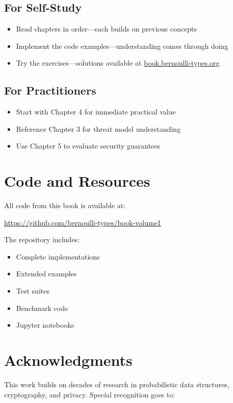 \subsection*{For Self-Study}
\begin{itemize}
\item Read chapters in order—each builds on previous concepts
\item Implement the code examples—understanding comes through doing
\item Try the exercises—solutions available at \url{book.bernoulli-types.org}
\end{itemize}

\subsection*{For Practitioners}
\begin{itemize}
\item Start with Chapter 4 for immediate practical value
\item Reference Chapter 3 for threat model understanding
\item Use Chapter 5 to evaluate security guarantees
\end{itemize}

\section*{Code and Resources}

All code from this book is available at:
\begin{center}
\url{https://github.com/bernoulli-types/book-volume1}
\end{center}

The repository includes:
\begin{itemize}
\item Complete implementations
\item Extended examples
\item Test suites
\item Benchmark code
\item Jupyter notebooks
\end{itemize}

\section*{Acknowledgments}

This work builds on decades of research in probabilistic data structures, cryptography, and privacy. Special recognition goes to:

